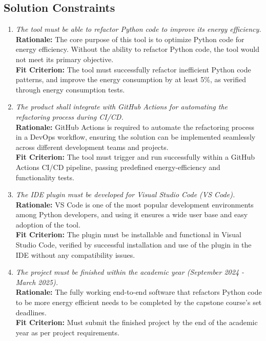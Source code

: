 \documentclass[12pt]{article}
\begin{document}
\subsection{Solution Constraints}
\begin{enumerate}[label=MDC-SL \arabic*., wide=0pt, leftmargin=*]
    \item \emph{The tool must be able to refactor Python code to improve its energy efficiency.}\\[2mm]
    {\bf Rationale:} The core purpose of this tool is to optimize Python code for energy efficiency. Without the ability to refactor Python code, the tool would not meet its primary objective.\\
    {\bf Fit Criterion:} The tool must successfully refactor inefficient Python code patterns, and improve the energy consumption by at least 5\%, as verified through energy consumption tests.

    \item \emph{The product shall integrate with GitHub Actions for automating the refactoring process during CI/CD.}\\[2mm]
    {\bf Rationale:} GitHub Actions is required to automate the refactoring process in a DevOps workflow, ensuring the solution can be implemented seamlessly across different development teams and projects.\\
    {\bf Fit Criterion:} The tool must trigger and run successfully within a GitHub Actions CI/CD pipeline, passing predefined energy-efficiency and functionality tests.

    \item \emph{The IDE plugin must be developed for Visual Studio Code (VS Code).}\\[2mm]
    {\bf Rationale:} VS Code is one of the most popular development environments among Python developers, and using it ensures a wide user base and easy adoption of the tool.\\
    {\bf Fit Criterion:} The plugin must be installable and functional in Visual Studio Code, verified by successful installation and use of the plugin in the IDE without any compatibility issues.

    \item \emph{The project must be finished within the academic year (September 2024 - March 2025).}\\[2mm]
    {\bf Rationale:} The fully working end-to-end software that refactors Python code to be more energy efficient needs to be completed by the capstone course's set deadlines.\\
    {\bf Fit Criterion:} Must submit the finished project by the end of the academic year as per project requirements.
\end{enumerate}
\end{document}
